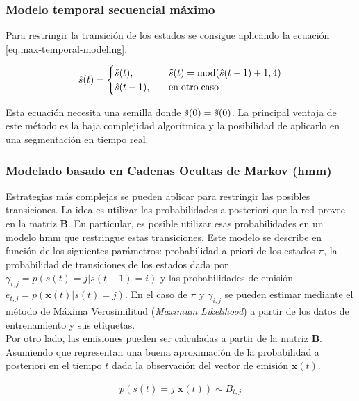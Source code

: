 \subsubsection*{Modelo temporal secuencial máximo}

\indent Para restringir la transición de los estados se consigue aplicando la ecuación \ref{eq:max-temporal-modeling}.

\begin{align} \label{eq:max-temporal-modeling}
  \hat{s}(t) =
  \begin{cases}
    \Tilde{s}(t), \quad &\Tilde{s}(t) = \mathrm{mod}(\hat{s}(t-1)+1, 4)\\
    \hat{s}(t-1), \quad &\mathrm{en\;otro\;caso}
  \end{cases}
\end{align}

\indent Esta ecuación necesita una semilla donde $\hat{s}(0) = \Tilde{s}(0)$. La principal ventaja de este método es
la baja complejidad algorítmica y la posibilidad de aplicarlo en una segmentación en tiempo real.

\subsubsection*{Modelado basado en Cadenas Ocultas de Markov (\gls{hmm})}

\indent Estrategias más complejas se pueden aplicar para restringir las posibles transiciones. La idea es utilizar
las probabilidades a posteriori que la red provee en la matriz $\mathbf{B}$. En particular, es posible utilizar esas
probabilidades en un modelo \gls{hmm} que restringue estas transiciones. Este modelo se describe en función de
los siguientes parámetros: probabilidad a priori de los estados $\pi$, la probabilidad de transiciones de los
estados dada por $\gamma_{i,j} = p(s(t)=j|s(t-1)=i)$ y las probabilidades de emisión $e_{t,j} = p(\mathbf{x}(t)|s(t)
= j)$. En el caso de $\pi$ y $\gamma_{i,j}$ se pueden estimar mediante el método de Máxima Verosimilitud
(\textit{Maximum Likelihood}) a partir de los datos de entrenamiento y sus etiquetas. \\
\indent Por otro lado, las emisiones pueden ser calculadas a partir de la matriz $\mathbf{B}$. Asumiendo que
representan una buena aproximación de la probabilidad a posteriori en el tiempo $t$ dada la observación del vector
de emisión $\mathbf{x}(t)$.

\begin{align}
  p(s(t) = j | \mathbf{x}(t)) \sim B_{t,j}
\end{align}

